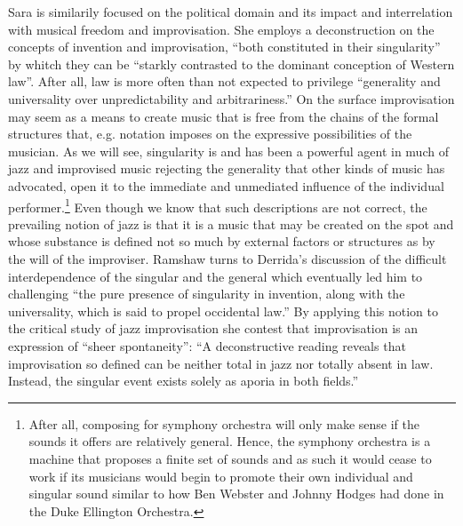 \documentclass[a4paper]{article}
\begin{document}
Sara \citet{ramshaw2006} is similarily focused on the political domain and its impact and interrelation with musical freedom and improvisation. She employs a deconstruction on the concepts of invention and improvisation, ``both constituted in their singularity'' by whitch they can be ``starkly contrasted to the dominant conception of Western law''. After all, law is more often than not expected to privilege ``generality and universality over unpredictability and arbitrariness.'' On the surface improvisation may seem as a means to create music that is free from the chains of the formal structures that, e.g. notation imposes on the expressive possibilities of the musician. As we will see, singularity is and has been a powerful agent in much of jazz and improvised music rejecting the generality that other kinds of music has advocated, open it to the immediate and unmediated influence of the individual performer.\footnote{After all, composing for symphony orchestra will only make sense if the sounds it offers are relatively general. Hence, the symphony orchestra is a machine that proposes a finite set of sounds and as such it would cease to work if its musicians would begin to promote their own individual and singular sound similar to how Ben Webster and Johnny Hodges had done in the Duke Ellington Orchestra.} Even though we know that such descriptions are not correct, the prevailing notion of jazz is that it is a music that may be created on the spot and whose substance is defined not so much by external factors or structures as by the will of the improviser. Ramshaw turns to Derrida's discussion of the difficult interdependence of the singular and the general which eventually led him to challenging ``the pure presence of singularity in invention, along with the universality, which is said to propel occidental law.'' By applying this notion to the critical study of jazz improvisation she contest that improvisation is an expression of ``sheer spontaneity'': ``A deconstructive reading reveals that improvisation so defined can be neither total in jazz nor totally absent in law. Instead, the singular event exists solely as aporia in both fields.''
\end{document}

